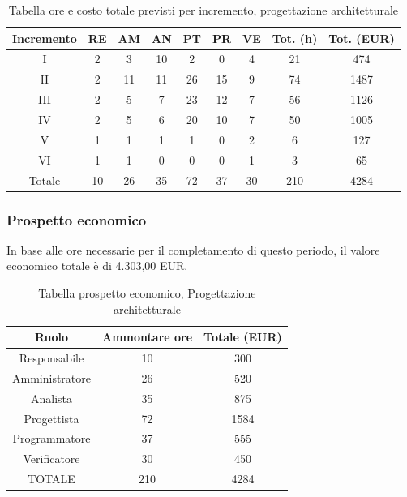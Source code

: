 \begin{table}[h]
	\caption{Tabella ore e costo totale previsti per incremento, progettazione architetturale}
	\begin{center}
		\begin{tabular}{ |c|c|c|c|c|c|c|c|c|  }
			\hline
			Incremento 		& RE 	& AM 	& AN 	& PT 	& PR 	& VE 	& Tot. (h) & Tot. (EUR) \\
			\hline\hline
			I		& 2 		& 3			& 10 	& 2 	& 0 		& 4 		& 21	 & 474\\
			II		& 2 		& 11 		& 11 	& 26	& 15 		& 9 		& 74	&1487\\
			III		& 2 		& 5 		& 7 	& 23	& 12 		& 7 		& 56	&1126\\
			IV		& 2 		& 5 		& 6 	& 20 	& 10 		& 7 		& 50 	&1005\\
			V		& 1 		& 1 		& 1 	& 1		& 0 		& 2	 		& 6			&127\\
			VI		& 1 		& 1 		& 0 	& 0 	& 0 		& 1 		& 3			&65\\
			\hline\hline
			Totale		& 10		& 26		& 35 	& 72	 	& 37 	& 30 	& 210 	&4284\\
			\hline
		\end{tabular}
	\end{center}
\end{table}

\subsubsection{Prospetto economico}
In base alle ore necessarie per il completamento di questo periodo, il valore economico totale è di 4.303,00 EUR.
\begin{table}[h]
	\caption{Tabella prospetto economico, Progettazione architetturale}
\begin{center}
\begin{tabular}{ |c|c|c|  }
 \hline
 Ruolo 		& Ammontare ore 	& Totale (EUR)\\
 	\hline
 \hline
 	Responsabile	& 10 	& 300\\
	Amministratore	& 26		& 520\\
	Analista		& 35 	& 875\\
	Progettista		& 72		& 1584\\
	Programmatore	& 37		& 555\\
	Verificatore	& 30 	& 450\\
 \hline\hline
 TOTALE		& 210		& 4284\\
  \hline
\end{tabular}
\end{center}
\end{table}
\newpage
